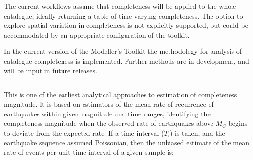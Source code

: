The current workflows assume that completeness will be applied to the whole catalogue, ideally returning a table of time-varying completeness. The option to explore spatial variation in completeness is not explicitly supported, but could be accommodated by an appropriate configuration of the toolkit.

In the current version of the Modeller's Toolkit the \textcite{Stepp1971} methodology for analysis of catalogue completeness is implemented. Further methods are in development, and will be input in future releases.

%
%

\subsection{\cite{Stepp1971}}

This is one of the earliest analytical approaches to estimation of completeness magnitude. It is based on estimators of the mean rate of recurrence of earthquakes within given magnitude and time ranges, identifying the completeness magnitude when the observed rate of earthquakes above $M_C$ begins to deviate from the expected rate. If a time interval ($T_i$) is taken, and the earthquake sequence assumed Poissonian, then the unbiased estimate of the mean rate of events per unit time interval of a given sample is:

